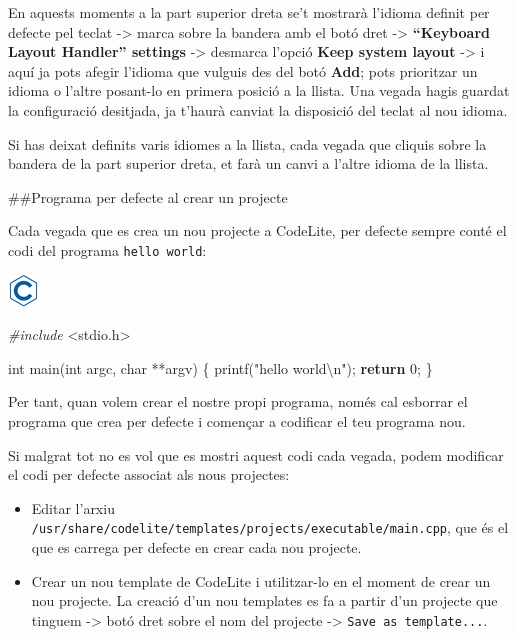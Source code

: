\documentclass[]{book}
\newenvironment{Shaded}{\begin{snugshade}}{\end{snugshade}}
\newcommand{\ControlFlowTok}[1]{\textcolor[rgb]{0.13,0.29,0.53}{\textbf{#1}}}
\newcommand{\DataTypeTok}[1]{\textcolor[rgb]{0.13,0.29,0.53}{#1}}
\newcommand{\DecValTok}[1]{\textcolor[rgb]{0.00,0.00,0.81}{#1}}
\newcommand{\ImportTok}[1]{#1}
\newcommand{\NormalTok}[1]{#1}
\newcommand{\PreprocessorTok}[1]{\textcolor[rgb]{0.56,0.35,0.01}{\textit{#1}}}
\newcommand{\SpecialCharTok}[1]{\textcolor[rgb]{0.00,0.00,0.00}{#1}}
\newcommand{\StringTok}[1]{\textcolor[rgb]{0.31,0.60,0.02}{#1}}
\providecommand{\tightlist}{%
  \setlength{\itemsep}{0pt}\setlength{\parskip}{0pt}}
\begin{document}
En aquests moments a la part superior dreta se't mostrarà l'idioma definit per defecte pel teclat -\textgreater{} marca sobre la bandera amb el botó dret -\textgreater{} \textbf{``Keyboard Layout Handler'' settings} -\textgreater{} desmarca l'opció \textbf{Keep system layout} -\textgreater{} i aquí ja pots afegir l'idioma que vulguis des del botó \textbf{Add}; pots prioritzar un idioma o l'altre posant-lo en primera posició a la llista. Una vegada hagis guardat la configuració desitjada, ja t'haurà canviat la disposició del teclat al nou idioma.

Si has deixat definits varis idiomes a la llista, cada vegada que cliquis sobre la bandera de la part superior dreta, et farà un canvi a l'altre idioma de la llista.

\#\#Programa per defecte al crear un projecte

Cada vegada que es crea un nou projecte a CodeLite, per defecte sempre conté el codi del programa \texttt{hello\ world}:

\includegraphics{./img/c.png}

\begin{Shaded}
\begin{Highlighting}[]
\PreprocessorTok{\#include }\ImportTok{\textless{}stdio.h\textgreater{}}

\DataTypeTok{int}\NormalTok{ main(}\DataTypeTok{int}\NormalTok{ argc, }\DataTypeTok{char}\NormalTok{ **argv)}
\NormalTok{\{}
\NormalTok{    printf(}\StringTok{"hello world}\SpecialCharTok{\textbackslash{}n}\StringTok{"}\NormalTok{);}
    \ControlFlowTok{return} \DecValTok{0}\NormalTok{;}
\NormalTok{\}}
\end{Highlighting}
\end{Shaded}

Per tant, quan volem crear el nostre propi programa, només cal esborrar el programa que crea per defecte i començar a codificar el teu programa nou.

Si malgrat tot no es vol que es mostri aquest codi cada vegada, podem modificar el codi per defecte associat als nous projectes:

\begin{itemize}
\tightlist
\item
  Editar l'arxiu \texttt{/usr/share/codelite/templates/projects/executable/main.cpp}, que és el que es carrega per defecte en crear cada nou projecte.
\item
  Crear un nou template de CodeLite i utilitzar-lo en el moment de crear un nou projecte. La creació d'un nou templates es fa a partir d'un projecte que tinguem -\textgreater{} botó dret sobre el nom del projecte -\textgreater{} \texttt{Save\ as\ template...}.
\end{itemize}
\end{document}
